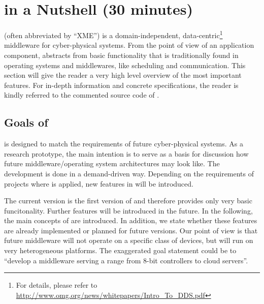 %
% 
%
%
%
%

\section{\xme in a Nutshell (30 minutes)} \label{sec:architecture}

\xme (often abbreviated by ``XME'') is a domain-independent, data-centric\footnote{%
For details, please refer to \url{http://www.omg.org/news/whitepapers/Intro_To_DDS.pdf}}
middleware for cyber-physical systems.
%
From the point of view of an application component,
\xme abstracts from basic functionality that is traditionally found in operating systems and middlewares,
like scheduling and communication.
%
This section will give the reader a very high level overview of the most important \xme features.
For in-depth information and concrete specifications, the reader is kindly referred to the commented source code of \xme.

\subsection{Goals of \xme}
\xme is designed to match the requirements of future cyber-physical systems.
As a research prototype, the main intention is to serve as a basis
for discussion how future middleware/operating system architectures may look like.
The development is done in a demand-driven way.
Depending on the requirements of projects where \xme is applied, new features in \xme will be introduced.

The current version is the first version of \xme and therefore provides only very basic funcitonality.
Further features will be introduced in the future. In the following, the main concepts of \xme are introduced.
In addition, we state whether these features are already implemented or planned for future versions.
%
%
Our point of view is that
future middleware will not operate on a specific class of devices, but will run on very heterogeneous platforms.
The exaggerated goal statement could be to ``develop a middleware serving a range from 8-bit controllers to cloud servers''.

